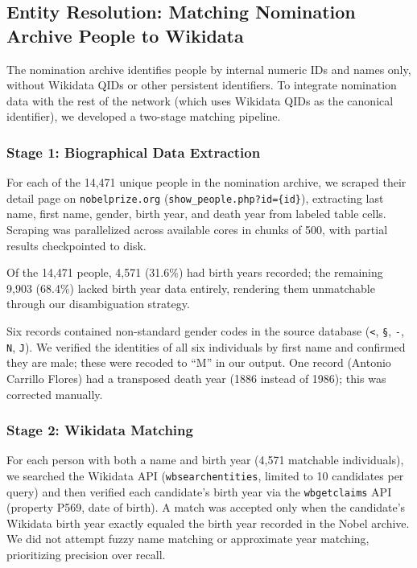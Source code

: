 \subsection{Entity Resolution: Matching Nomination Archive People to
Wikidata}\label{sec:entity-resolution}

The nomination archive identifies people by internal numeric IDs and names
only, without Wikidata QIDs or other persistent identifiers. To integrate
nomination data with the rest of the network (which uses Wikidata QIDs as
the canonical identifier), we developed a two-stage matching pipeline.

\subsubsection{Stage 1: Biographical Data Extraction}

For each of the 14{,}471 unique people in the nomination archive, we
scraped their detail page on \texttt{nobelprize.org}
(\texttt{show\_people.php?id=\{id\}}), extracting last name, first name,
gender, birth year, and death year from labeled table cells. Scraping was
parallelized across available cores in chunks of 500, with partial results
checkpointed to disk.

Of the 14{,}471 people, 4{,}571 (31.6\%) had birth years recorded;
the remaining 9{,}903 (68.4\%) lacked birth year data entirely,
rendering them unmatchable through our disambiguation strategy.

Six records contained non-standard gender codes in the source database
(\texttt{<}, \texttt{\S}, \texttt{-}, \texttt{N}, \texttt{J}). We verified
the identities of all six individuals by first name and confirmed they are
male; these were recoded to ``M'' in our output. One record (Antonio
Carrillo Flores) had a transposed death year (1886 instead of 1986); this
was corrected manually.

\subsubsection{Stage 2: Wikidata Matching}

For each person with both a name and birth year (4{,}571 matchable
individuals), we searched the Wikidata API
(\texttt{wbsearchentities}, limited to 10 candidates per query) and then
verified each candidate's birth year via the \texttt{wbgetclaims} API
(property P569, date of birth). A match was accepted only when the
candidate's Wikidata birth year exactly equaled the birth year recorded
in the Nobel archive. We did not attempt fuzzy name matching or
approximate year matching, prioritizing precision over recall.


